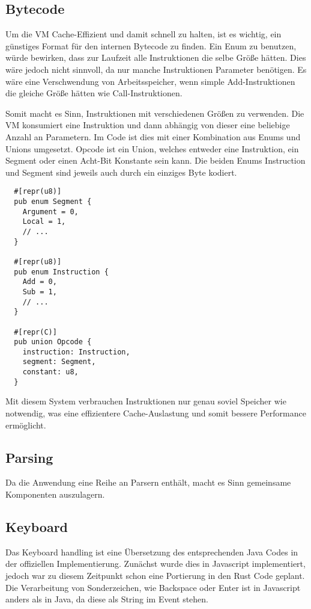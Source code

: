 \subsection{Bytecode}

Um die VM Cache-Effizient und damit schnell zu halten, ist es wichtig, ein günstiges Format für den internen Bytecode zu finden.
Ein Enum zu benutzen, würde bewirken, dass zur Laufzeit alle Instruktionen die selbe Größe hätten. Dies wäre jedoch nicht sinnvoll, da nur manche Instruktionen Parameter benötigen.
Es wäre eine Verschwendung von Arbeitsspeicher, wenn simple Add-Instruktionen die gleiche Größe hätten wie Call-Instruktionen.

Somit macht es Sinn, Instruktionen mit verschiedenen Größen zu verwenden. Die VM konsumiert eine Instruktion und dann abhängig von dieser eine beliebige Anzahl an Parametern.
Im Code ist dies mit einer Kombination aus Enums und Unions umgesetzt. Opcode ist ein Union, welches entweder eine Instruktion, ein Segment oder einen Acht-Bit Konstante sein kann. Die beiden Enums Instruction und Segment sind jeweils auch durch ein einziges Byte kodiert.

\begin{lstlisting}
  #[repr(u8)]
  pub enum Segment {
    Argument = 0,
    Local = 1,
    // ...
  }

  #[repr(u8)]
  pub enum Instruction {
    Add = 0,
    Sub = 1,
    // ...
  }

  #[repr(C)]
  pub union Opcode {
    instruction: Instruction,
    segment: Segment,
    constant: u8,
  }
\end{lstlisting}

Mit diesem System verbrauchen Instruktionen nur genau soviel Speicher wie notwendig, was eine effizientere Cache-Auslastung und somit bessere Performance ermöglicht.

\subsection{Parsing}
Da die Anwendung eine Reihe an Parsern enthält, macht es Sinn gemeinsame Komponenten auszulagern.

\subsection{Keyboard}
Das Keyboard handling ist eine Übersetzung des entsprechenden Java Codes in der offiziellen Implementierung.
Zunächst wurde dies in Javascript implementiert, jedoch war zu diesem Zeitpunkt schon eine Portierung in den Rust Code geplant.
Die Verarbeitung von Sonderzeichen, wie Backspace oder Enter ist in Javascript anders als in Java, da diese als String im Event stehen.

